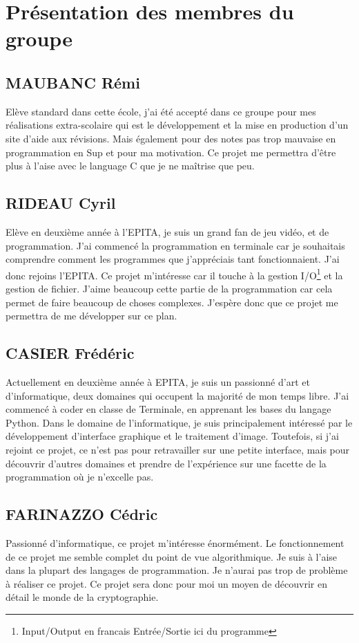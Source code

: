 \section{Présentation des membres du groupe}

    \subsection{MAUBANC Rémi}
        Elève standard dans cette école, j'ai été accepté dans ce groupe pour mes réalisations extra-scolaire qui est le développement et la mise en production d'un site d'aide aux révisions. Mais également pour des notes pas trop mauvaise en programmation en Sup et pour ma motivation. Ce projet me permettra d'être plus à l'aise avec le language C que je ne maîtrise que peu.
        
        
    \subsection{RIDEAU Cyril}
        Elève en deuxième année à l'EPITA, je suis un grand fan de jeu vidéo, et de programmation. J'ai commencé la programmation en terminale car je souhaitais comprendre comment les programmes que j'appréciais tant fonctionnaient. J'ai donc rejoins l'EPITA. Ce projet m'intéresse car il touche à la gestion I/O\footnote{Input/Output en francais Entrée/Sortie ici du programme} et la gestion de fichier. J'aime beaucoup cette partie de la programmation car cela permet de faire beaucoup de choses complexes. J'espère donc que ce projet me permettra de me développer sur ce plan.
        
    \subsection{CASIER Frédéric}
    	Actuellement en deuxième année à EPITA, je suis un passionné d’art et d’informatique, deux domaines qui occupent la majorité de mon temps libre. J’ai commencé à coder en classe de Terminale, en apprenant les bases du langage Python. Dans le domaine de l'informatique, je suis principalement intéressé par le développement d'interface graphique et le traitement d'image. Toutefois, si j'ai rejoint ce projet, ce n'est pas pour retravailler sur une petite interface, mais pour découvrir d'autres domaines et prendre de l'expérience sur une facette de la programmation où je n'excelle pas.
        
        
    \subsection{FARINAZZO Cédric}
        Passionné d’informatique, ce projet m’intéresse énormément. Le fonctionnement de ce projet me semble complet du point de vue algorithmique. Je suis à l’aise dans la plupart des langages de programmation. Je n’aurai pas trop de problème à réaliser ce projet. Ce projet sera donc pour moi un moyen de découvrir en détail le monde de la cryptographie.
        
